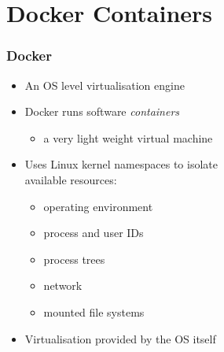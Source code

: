 \documentclass{beamer}
\begin{document}
\section{Docker Containers}

\begin{frame}
\frametitle<presentation>{Docker}


\begin{itemize}
  \item An OS level virtualisation engine
  \item Docker runs software \textit{containers}
  \begin{itemize} \item a very light weight virtual machine \end{itemize}
  \item Uses Linux kernel namespaces to isolate\\ available resources:
  \begin{itemize}
    \item operating environment
    \item process and user IDs 
    \item process trees 
    \item network
	\item mounted file systems
  \end{itemize}
  \item Virtualisation provided by the OS itself
\end{itemize}

\end{frame}
\end{document}

